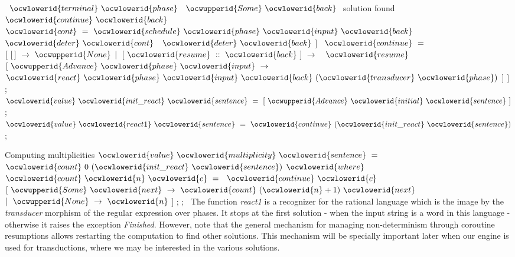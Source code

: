 \documentclass[12pt]{article}
\begin{document}
\ocwindent{4.00em}
~$\ocwlowerid{terminal}~\ocwlowerid{phase}~$~$\ocwupperid{Some}~\ocwlowerid{back}~$\ocwbc{} solution found \ocwec{}\ocweol
\ocwindent{4.00em}
~$\ocwlowerid{continue}~\ocwlowerid{back}$\ocweol
\ocwindent{3.00em}
~~$\ocwlowerid{cont}~=~\ocwlowerid{schedule}~\ocwlowerid{phase}~\ocwlowerid{input}~\ocwlowerid{back}~$\ocweol
\ocwindent{5.50em}
$\ocwlowerid{deter}~\ocwlowerid{cont}$\ocweol
\ocwindent{2.00em}
~$\ocwlowerid{deter}~\ocwlowerid{back}$\ocweol
\ocwindent{1.00em}
$]$\ocweol
\ocwindent{0.00em}
~$\ocwlowerid{continue}~=~$\ocweol
\ocwindent{1.00em}
$[~[\,]~\rightarrow{}~\ocwupperid{None}$\ocweol
\ocwindent{1.00em}
$\mid{}~[~\ocwlowerid{resume}~::~\ocwlowerid{back}~]~\rightarrow{}~$~$\ocwlowerid{resume}~$\ocweol
\ocwindent{3.00em}
$[~\ocwupperid{Advance}~\ocwlowerid{phase}~\ocwlowerid{input}~\rightarrow{}~$\ocweol
\ocwindent{4.50em}
$\ocwlowerid{react}~\ocwlowerid{phase}~\ocwlowerid{input}~\ocwlowerid{back}~(\ocwlowerid{transducer}~\ocwlowerid{phase})$\ocweol
\ocwindent{3.00em}
$]$\ocweol
\ocwindent{1.00em}
$]$\ocweol
\ocwindent{0.00em}
;\ocweol
\ocwindent{0.00em}
$\ocwlowerid{value}~\ocwlowerid{init\_react}~\ocwlowerid{sentence}~=~[~\ocwupperid{Advance}~\ocwlowerid{initial}~\ocwlowerid{sentence}~]$\ocweol
\ocwindent{0.00em}
;~\ocweol
\ocwindent{0.00em}
$\ocwlowerid{value}~\ocwlowerid{react1}~\ocwlowerid{sentence}~=~\ocwlowerid{continue}~(\ocwlowerid{init\_react}~\ocwlowerid{sentence})$\ocweol
\ocwindent{0.00em}
;\medskip

\ocwendcode{}\ocwindent{0.00em}
Computing multiplicities 
\ocweol
\label{../ML/react0.ml:2689}%
\medskip
\ocwbegincode{}\ocwindent{0.00em}
$\ocwlowerid{value}~\ocwlowerid{multiplicity}~\ocwlowerid{sentence}~=~$\ocweol
\ocwindent{1.00em}
$\ocwlowerid{count}~0~(\ocwlowerid{init\_react}~\ocwlowerid{sentence})$\ocweol
\ocwindent{1.00em}
$\ocwlowerid{where}~$~$\ocwlowerid{count}~\ocwlowerid{n}~\ocwlowerid{c}~=$\ocweol
\ocwindent{2.00em}
~$\ocwlowerid{continue}~\ocwlowerid{c}~$\ocweol
\ocwindent{2.00em}
$[~\ocwupperid{Some}~\ocwlowerid{next}~\rightarrow{}~\ocwlowerid{count}~(\ocwlowerid{n}+1)~\ocwlowerid{next}$\ocweol
\ocwindent{2.00em}
$\mid{}~\ocwupperid{None}~\rightarrow{}~\ocwlowerid{n}$\ocweol
\ocwindent{2.00em}
$]$\ocweol
\ocwindent{0.00em}
;\ocweol
\ocwindent{0.00em}
;~\ocweol
\ocweol
\ocwendcode{}The function {\sl react1} is a recognizer for the rational language which is the 
image by the {\sl transducer} morphism of the regular expression over phases. 
It stops at the first solution - when the input string is a word in this language 
- otherwise it raises the exception {\sl Finished}. However, note that the 
general mechanism for managing non-determinism through coroutine resumptions 
allows restarting the computation to find other solutions. This mechanism will 
be specially important later when our engine
is used for transductions, where we may be interested in the various solutions.
\end{document}
